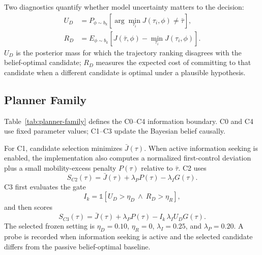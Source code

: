 \documentclass[journal]{IEEEtran}
\begin{document}
Two diagnostics quantify whether model uncertainty matters to the decision:
\begin{align}
U_D
&=
P_{\phi\sim b_k}
\!\left[
\arg\min_{\tau_i}J(\tau_i,\phi)\neq\bar\tau
\right],\\
R_D
&=
E_{\phi\sim b_k}
\!\left[
J(\bar\tau,\phi)-\min_{\tau_i}J(\tau_i,\phi)
\right].
\end{align}
$U_D$ is the posterior mass for which the trajectory ranking disagrees with the belief-optimal candidate; $R_D$ measures the expected cost of committing to that candidate when a different candidate is optimal under a plausible hypothesis.

\subsection{Planner Family}
Table~\ref{tab:planner-family} defines the C0--C4 information boundary. C0 and C4 use fixed parameter values; C1--C3 update the Bayesian belief causally.

\begin{table}[t]
\caption{Planner family and information boundary.}
\label{tab:planner-family}
\centering
\small
{}
\end{table}

For C1, candidate selection minimizes $\bar J(\tau)$. When active information seeking is enabled, the implementation also computes a normalized first-control deviation plus a small mobility-excess penalty $P(\tau)$ relative to $\bar\tau$. C2 uses
\begin{equation}
S_{C2}(\tau)=
\bar J(\tau)+\lambda_P P(\tau)-\lambda_I G(\tau).
\end{equation}
C3 first evaluates the gate
\begin{equation}
I_k=
\mathbb{1}
\!\left[
U_D>\eta_D
\ \wedge\
R_D>\eta_R
\right],
\end{equation}
and then scores
\begin{equation}
S_{C3}(\tau)=
\bar J(\tau)+\lambda_P P(\tau)
-
I_k\,\lambda_I U_D G(\tau).
\end{equation}
The selected frozen setting is $\eta_D=0.10$, $\eta_R=0$, $\lambda_I=0.25$, and $\lambda_P=0.20$. A probe is recorded when information seeking is active and the selected candidate differs from the passive belief-optimal baseline.
\end{document}
